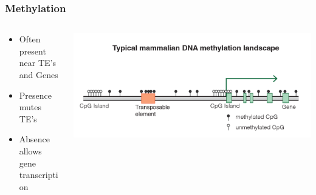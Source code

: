 \documentclass[14pt]{beamer}
\begin{document}
\begin{frame}
\frametitle{Methylation}
\begin{columns}
	\begin{column}{0.4\textwidth}
		\begin{itemize}
			\item<+-> Often present near TE's and Genes
			\item<+-> Presence mutes TE's
			\item<+-> Absence allows gene transcription
		\end{itemize}
		\end{column}
	\begin{column}{0.6\textwidth}
		\begin{center}
     		\includegraphics[width=1\textwidth]{images_20170926_methyl.png}
     	\end{center}
	\end{column}
\end{columns}
\end{frame}
\end{document}
